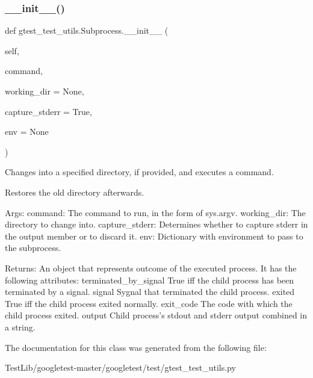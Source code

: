 \subsubsection{\texorpdfstring{\+\_\+\+\_\+init\+\_\+\+\_\+()}{\_\_init\_\_()}}
{\footnotesize\ttfamily def gtest\+\_\+test\+\_\+utils.\+Subprocess.\+\_\+\+\_\+init\+\_\+\+\_\+ (\begin{DoxyParamCaption}\item[{}]{self,  }\item[{}]{command,  }\item[{}]{working\+\_\+dir = {\ttfamily None},  }\item[{}]{capture\+\_\+stderr = {\ttfamily True},  }\item[{}]{env = {\ttfamily None} }\end{DoxyParamCaption})}

\begin{DoxyVerb}Changes into a specified directory, if provided, and executes a command.

Restores the old directory afterwards.

Args:
  command:        The command to run, in the form of sys.argv.
  working_dir:    The directory to change into.
  capture_stderr: Determines whether to capture stderr in the output member
              or to discard it.
  env:            Dictionary with environment to pass to the subprocess.

Returns:
  An object that represents outcome of the executed process. It has the
  following attributes:
terminated_by_signal   True iff the child process has been terminated
                       by a signal.
signal                 Sygnal that terminated the child process.
exited                 True iff the child process exited normally.
exit_code              The code with which the child process exited.
output                 Child process's stdout and stderr output
                       combined in a string.
\end{DoxyVerb}
 

The documentation for this class was generated from the following file\+:\begin{DoxyCompactItemize}
\item 
Test\+Lib/googletest-\/master/googletest/test/gtest\+\_\+test\+\_\+utils.\+py\end{DoxyCompactItemize}
